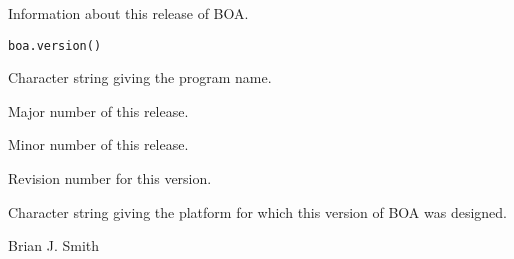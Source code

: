 \begin{Description}\relax
Information about this release of BOA.
\end{Description}
\begin{Usage}
\begin{verbatim}
boa.version()
\end{verbatim}
\end{Usage}
\begin{Value}
\begin{ldescription}
\item[\code{name}] Character string giving the program name.
\item[\code{major}] Major number of this release.
\item[\code{minor}] Minor number of this release.
\item[\code{revision}] Revision number for this version.
\item[\code{system}] Character string giving the platform for which this version 
of BOA was designed.
\end{ldescription}
\end{Value}
\begin{Author}\relax
Brian J. Smith
\end{Author}
\begin{SeeAlso}\relax
{}
\end{SeeAlso}

